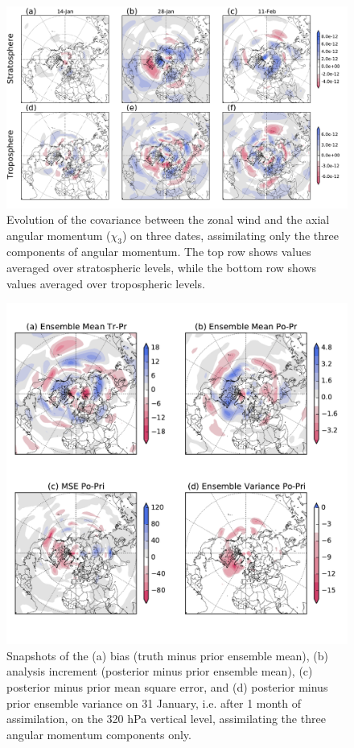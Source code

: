  \begin{figure}
	 \includegraphics[width=\textwidth]{Paper_figures/ERPDA_paper_U_to_LOD_covariances_.pdf}
	 \caption{Evolution of the covariance between the zonal wind and the axial angular momentum ($\chi_3$) on three dates, assimilating only the three components of angular momentum. The top row shows values averaged over stratospheric levels, while the bottom row shows values averaged over tropospheric levels.}
 \label{fig:covariances}
\end{figure}

 \begin{figure}
	 \includegraphics[width=\textwidth]{Paper_figures/ERPDA_paper_U_priorerror_vs_increment_vs_ER_31jan.pdf}
	 \caption{Snapshots of the (a) bias (truth minus prior ensemble mean), (b) analysis increment (posterior minus prior ensemble mean), (c) posterior minus prior mean square error, and (d) posterior minus prior ensemble variance on 31 January, i.e. after 1 month of assimilation, on the 320 hPa vertical level, assimilating the three angular momentum components only. } 
 \label{fig:error_increments}
\end{figure}


